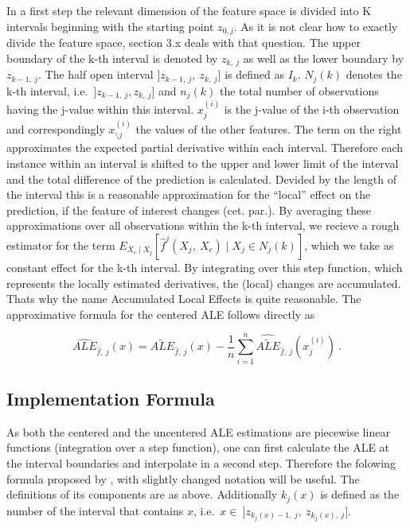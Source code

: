 \documentclass[
]{krantz}
\begin{document}
In a first step the relevant dimension of the feature space is divided into K intervals beginning with the starting point \(z_{0, j}\). As it is not clear how to exactly divide the feature space, section 3.x deals with that question. The upper boundary of the k-th interval is denoted by \(z_{k, ~j}\) as well as the lower boundary by \(z_{k-1, ~j}\). The half open interval \(]z_{k-1,~j},~z_{k,~j}]\) is defined as \(I_k\). \(N_j(k)\) denotes the k-th interval, i.e.~\(]z_{k-1,~j}, z_{k,~j}]\) and \(n_j(k)\) the total number of observations having the j-value within this interval. \(x_j^{(i)}\) is the j-value of the i-th observation and correspondingly \(x_{\setminus j}^{(i)}\) the values of the other features. The term on the right approximates the expected partial derivative within each interval.
Therefore each instance within an interval is shifted to the upper and lower limit of the interval and the total difference of the prediction is calculated. Devided by the length of the interval this is a reasonable approximation for the ``local'' effect on the prediction, if the feature of interest changes (cet. par.).
By averaging these approximations over all observations within the k-th interval, we recieve a rough estimator for the term \(E_{X_c \mid X_j} [\hat{f}^j(X_j,~X_c)\mid X_j \in N_j(k)]\), which we take as constant effect for the k-th interval.
By integrating over this step function, which represents the locally estimated derivatives, the (local) changes are accumulated. Thats why the name Accumulated Local Effects is quite reasonable.
The approximative formula for the centered ALE follows directly as

\[ \widehat{ALE}_{\hat{f},~j}(x) = \widehat{\widetilde{ALE}}_{\hat{f},~j}(x) - \frac{1}{n} \sum_{i=1}^{n} \widehat{\widetilde{ALE}}_{\hat{f},~j}(x_j^{(i)})~. 
 \]

\hypertarget{implementation-formula}{%
\subsection{Implementation Formula}\label{implementation-formula}}

As both the centered and the uncentered ALE estimations are piecewise linear functions (integration over a step function), one can first calculate the ALE at the interval boundaries and interpolate in a second step. Therefore the folowing formula proposed by \citep[page 11]{Apley2016} , with slightly changed notation will be useful. The definitions of its components are as above. Additionally \(k_j(x)\) is defined as the number of the interval that contains \(x\), i.e.~\(x \in ~]z_{k_j(x)-1,~j},~z_{k_j(x),~j}]\).
\end{document}
